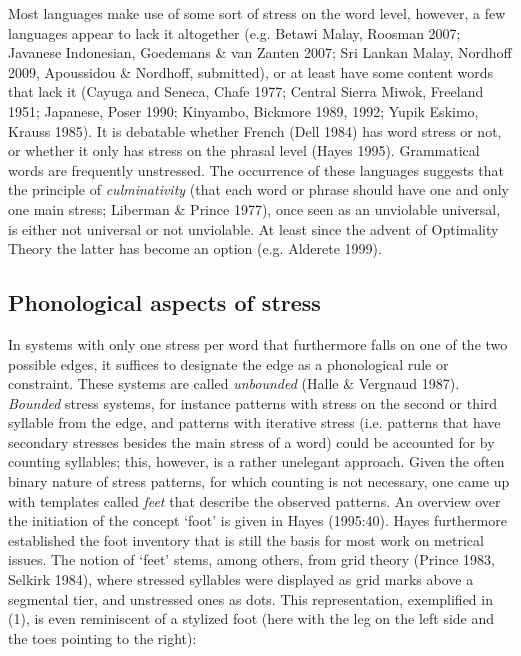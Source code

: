 \documentclass[a4paper]{article}
\begin{document}
Most languages make use of some sort of stress on the word level, however, a few languages appear to lack it altogether (e.g. Betawi Malay, Roosman 2007; Javanese Indonesian, Goedemans \& van Zanten 2007; Sri Lankan Malay, Nordhoff 2009, Apoussidou \& Nordhoff, submitted), or at least have some content words that lack it (Cayuga and Seneca, Chafe 1977; Central Sierra Miwok, Freeland 1951; Japanese, Poser 1990; Kinyambo, Bickmore 1989, 1992; Yupik Eskimo, Krauss 1985). It is debatable whether French (Dell 1984) has word stress or not, or whether it only has stress on the phrasal level (Hayes 1995). Grammatical words are frequently unstressed. The occurrence of these languages suggests that the principle of \textit{culminativity} (that each word or phrase should have one and only one main stress; Liberman \& Prince 1977), once seen as an unviolable universal, is either not universal or not unviolable. At least since the advent of Optimality Theory the latter has become an option (e.g. Alderete 1999).


\subsection{
Phonological aspects of stress}

In systems with only one stress per word that furthermore falls on one of the two possible edges, it suffices to designate the edge as a phonological rule or constraint. These systems are called \textit{unbounded} (Halle \& Vergnaud 1987). \textit{Bounded} stress systems, for instance patterns with stress on the second or third syllable from the edge, and patterns with iterative stress (i.e. patterns that have secondary stresses besides the main stress of a word) could be accounted for by counting syllables; this, however, is a rather unelegant approach. Given the often binary nature of stress patterns, for which counting is not necessary, one came up with templates called \textit{feet} that describe the observed patterns. An overview over the initiation of the concept ‘foot’ is given in Hayes (1995:40). Hayes furthermore established the foot inventory that is still the basis for most work on metrical issues. The notion of ‘feet’ stems, among others, from grid theory (Prince 1983, Selkirk 1984), where stressed syllables were displayed as grid marks above a segmental tier, and unstressed ones as dots. This representation, exemplified in (1), is even reminiscent of a stylized foot (here with the leg on the left side and the toes pointing to the right):
\end{document}
